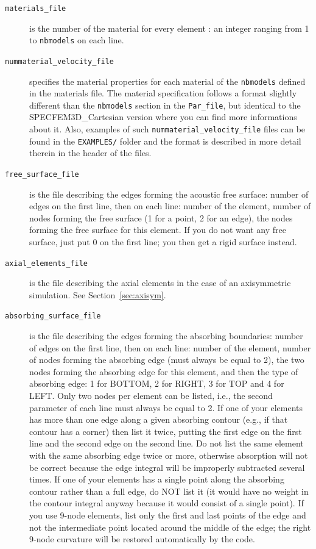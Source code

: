 \begin{description}
\begin{description}
     \item[{\texttt{materials\_file}}] is the number of the material for every element : an integer ranging from 1 to \texttt{nbmodels} on each line.

     \item[{\texttt{nummaterial\_velocity\_file}}] specifies the material properties for each material of the \texttt{nbmodels} defined in the materials file. The material specification follows a format slightly different than the \texttt{nbmodels} section in the \texttt{Par\_file}, but identical to the SPECFEM3D\_Cartesian version where you can find more informations about it. Also, examples of such \texttt{nummaterial\_velocity\_file} files can be found in the \texttt{EXAMPLES/} folder and the format is described in more detail therein in the header of the files.

     \item[{\texttt{free\_surface\_file}}] is the file describing the edges forming the acoustic free surface: number of edges on the first line, then on each line: number of the element, number of nodes forming the free surface (1 for a point, 2 for an edge), the nodes forming the free surface for this element. If you do not want any free surface, just put 0 on the first line; you then get a rigid surface instead.

     \item[{\texttt{axial\_elements\_file}}] is the file describing the axial elements in the case of an axisymmetric simulation. See Section~\ref{sec:axisym}.

     \item[{\texttt{absorbing\_surface\_file}}] is the file describing the edges forming the absorbing boundaries:
number of edges on the first line, then on each line: number of the element, number of nodes forming the absorbing edge (must always be equal to 2),
the two nodes forming the absorbing edge for this element, and then the type of absorbing edge: 1 for BOTTOM, 2 for RIGHT, 3 for TOP and 4 for LEFT.
Only two nodes per element can be listed, i.e., the second parameter of each line must always be equal to 2.
If one of your elements has more than one edge along a given absorbing contour
(e.g., if that contour has a corner) then list it twice,
putting the first edge on the first line and the second edge on the second line.
Do not list the same element with the same absorbing edge twice or more, otherwise absorption will not be correct because the edge integral
will be improperly subtracted several times.
If one of your elements has a single point along the absorbing contour rather than a full edge, do NOT list it
(it would have no weight in the contour integral anyway because it would consist of a single point).
If you use 9-node elements, list only the first and last points of the edge and not the intermediate point
located around the middle of the edge; the right 9-node curvature will be restored automatically by the code.


\end{description}
\end{description}
